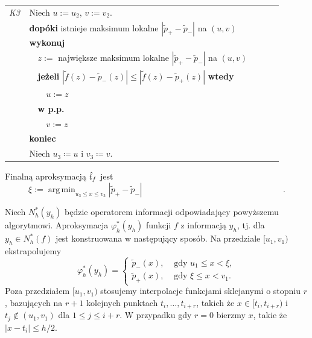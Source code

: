\documentclass[oik, pdftex, man]{mgrwms}
\DeclareMathOperator*{\argmin}{arg\,min}
\begin{document}
    \begin{table}[H]
        \begin{tabular}{p{0.045\linewidth} p{0.85\linewidth}}
        \textit{K3}     & Niech $u := u_2$, $v := v_2$. \\
                        & \textbf{dopóki} istnieje maksimum lokalne $|\tilde{p}_{+} - \tilde{p}_{-}|$ na $(u,v)$ \textbf{wykonuj} \\
                        & $\quad$$z :=$ największe maksimum lokalne $|\tilde{p}_{+} - \tilde{p}_{-}|$ na $(u,v)$ \\
                        & $\quad$\textbf{jeżeli} $|\tilde{f}(z) - \tilde{p}_{-}(z)| \leq |\tilde{f}(z) - \tilde{p}_{+}(z)|$ \textbf{wtedy} \\
                        & $\quad\quad$$u:= z$ \\
                        & $\quad$\textbf{w p.p.} \\
                        & $\quad\quad$$v:= z$ \\
                        & \textbf{koniec} \\
                        & Niech $u_3 \coloneqq u$ i $v_3 \coloneqq v$.
        \end{tabular}
    \end{table}

    Finalną aproksymacją $\hat{t}_f$ jest
    \begin{equation*}
            \xi := \argmin_{u_3 \leq x \leq v_3}|\tilde{p}_{+} - \tilde{p}_{-}| \hspace{200pt}.
    \end{equation*}

    Niech $N_{h}^{*}(y_{h})$ będzie operatorem informacji odpowiadający powyższemu algorytmowi. Aproksymacja $\varphi_{h}^{*}(y_{h})$ funkcji $f$ z informacją $y_{h}$, tj. dla $y_{h} \in N_{h}^{*}(f)$ jest konstruowana w następujący sposób. Na przedziale $[u_{1}, v_{1})$ ekstrapolujemy
    \begin{equation*}
        \varphi_{h}^{*}\left(y_{h}\right)= \begin{cases}
            \tilde{p}_{-}(x),  &\text { gdy } u_{1} \leq x< \xi, \\
            \tilde{p}_{+}(x),  &\text { gdy } \xi \leq x<v_{1}.
        \end{cases}
    \end{equation*}
    Poza przedziałem $[u_{1}, v_{1})$ stosujemy interpolacje funkcjami sklejanymi o stopniu $r$, bazujących na $r+1$ kolejnych punktach $t_{i}, \ldots, t_{i+r}$, takich że $x \in [t_{i},t_{i+r})$ i $t_{j} \notin (u_{1},v_{1})$ dla $1 \leq j \leq i+r$. W przypadku gdy $r=0$ bierzmy $x$, takie że $|x-t_{i}| \leq h/2$.
\end{document}
